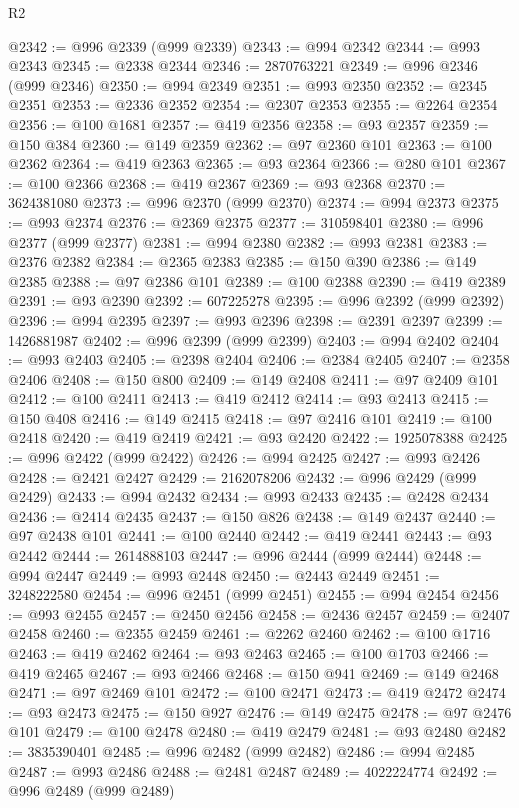 \begin{lexlean}{R2}
\begin{coremodule}
@2342 := @996 @2339 (@999 @2339)
@2343 := @994 @2342
@2344 := @993 @2343
@2345 := @2338 @2344
@2346 := 2870763221
@2349 := @996 @2346 (@999 @2346)
@2350 := @994 @2349
@2351 := @993 @2350
@2352 := @2345 @2351
@2353 := @2336 @2352
@2354 := @2307 @2353
@2355 := @2264 @2354
@2356 := @100 @1681
@2357 := @419 @2356
@2358 := @93 @2357
@2359 := @150 @384
@2360 := @149 @2359
@2362 := @97 @2360 @101
@2363 := @100 @2362
@2364 := @419 @2363
@2365 := @93 @2364
@2366 := @280 @101
@2367 := @100 @2366
@2368 := @419 @2367
@2369 := @93 @2368
@2370 := 3624381080
@2373 := @996 @2370 (@999 @2370)
@2374 := @994 @2373
@2375 := @993 @2374
@2376 := @2369 @2375
@2377 := 310598401
@2380 := @996 @2377 (@999 @2377)
@2381 := @994 @2380
@2382 := @993 @2381
@2383 := @2376 @2382
@2384 := @2365 @2383
@2385 := @150 @390
@2386 := @149 @2385
@2388 := @97 @2386 @101
@2389 := @100 @2388
@2390 := @419 @2389
@2391 := @93 @2390
@2392 := 607225278
@2395 := @996 @2392 (@999 @2392)
@2396 := @994 @2395
@2397 := @993 @2396
@2398 := @2391 @2397
@2399 := 1426881987
@2402 := @996 @2399 (@999 @2399)
@2403 := @994 @2402
@2404 := @993 @2403
@2405 := @2398 @2404
@2406 := @2384 @2405
@2407 := @2358 @2406
@2408 := @150 @800
@2409 := @149 @2408
@2411 := @97 @2409 @101
@2412 := @100 @2411
@2413 := @419 @2412
@2414 := @93 @2413
@2415 := @150 @408
@2416 := @149 @2415
@2418 := @97 @2416 @101
@2419 := @100 @2418
@2420 := @419 @2419
@2421 := @93 @2420
@2422 := 1925078388
@2425 := @996 @2422 (@999 @2422)
@2426 := @994 @2425
@2427 := @993 @2426
@2428 := @2421 @2427
@2429 := 2162078206
@2432 := @996 @2429 (@999 @2429)
@2433 := @994 @2432
@2434 := @993 @2433
@2435 := @2428 @2434
@2436 := @2414 @2435
@2437 := @150 @826
@2438 := @149 @2437
@2440 := @97 @2438 @101
@2441 := @100 @2440
@2442 := @419 @2441
@2443 := @93 @2442
@2444 := 2614888103
@2447 := @996 @2444 (@999 @2444)
@2448 := @994 @2447
@2449 := @993 @2448
@2450 := @2443 @2449
@2451 := 3248222580
@2454 := @996 @2451 (@999 @2451)
@2455 := @994 @2454
@2456 := @993 @2455
@2457 := @2450 @2456
@2458 := @2436 @2457
@2459 := @2407 @2458
@2460 := @2355 @2459
@2461 := @2262 @2460
@2462 := @100 @1716
@2463 := @419 @2462
@2464 := @93 @2463
@2465 := @100 @1703
@2466 := @419 @2465
@2467 := @93 @2466
@2468 := @150 @941
@2469 := @149 @2468
@2471 := @97 @2469 @101
@2472 := @100 @2471
@2473 := @419 @2472
@2474 := @93 @2473
@2475 := @150 @927
@2476 := @149 @2475
@2478 := @97 @2476 @101
@2479 := @100 @2478
@2480 := @419 @2479
@2481 := @93 @2480
@2482 := 3835390401
@2485 := @996 @2482 (@999 @2482)
@2486 := @994 @2485
@2487 := @993 @2486
@2488 := @2481 @2487
@2489 := 4022224774
@2492 := @996 @2489 (@999 @2489)

\end{coremodule}
\end{lexlean}
